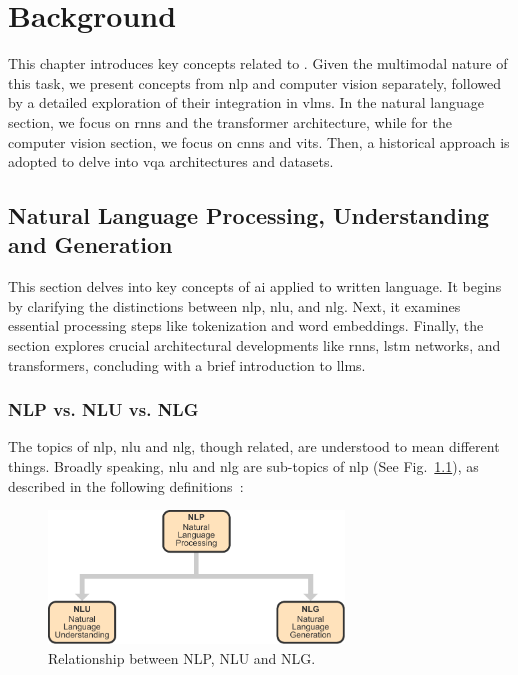 \chapter{Background}
\label{chapter:background}

This chapter introduces key concepts related to . Given the multimodal nature of this task, we present concepts from \gls{nlp} and computer vision separately, followed by a detailed exploration of their integration in \glspl{vlm}. In the natural language section, we focus on \glspl{rnn} and the transformer architecture, while for the computer vision section, we focus on \glspl{cnn} and \glspl{vit}. Then, a historical approach is adopted to delve into \gls{vqa} architectures and datasets.

\newpage


\section{Natural Language Processing, Understanding and Generation}

This section delves into key concepts of \gls{ai} applied to written language. It begins by clarifying the distinctions between \gls{nlp}, \gls{nlu}, and \gls{nlg}. Next, it examines essential processing steps like tokenization and word embeddings. Finally, the section explores crucial architectural developments like \glspl{rnn}, \gls{lstm} networks, and transformers, concluding with a brief introduction to \glspl{llm}.

\subsection{NLP vs. NLU vs. NLG}

The topics of \gls{nlp}, \gls{nlu} and \gls{nlg}, though related, are understood to mean different things. Broadly speaking, \gls{nlu} and \gls{nlg} are sub-topics of \gls{nlp} (See Fig.~\ref{fig:nlp_nlu_nlg}), as described in the following definitions~\cite{ibmNLGDifferences,datasolutNLGUnterschiede}:

\begin{figure}[!ht]
\begin{center}
\includegraphics[width=0.70\textwidth]{Figures/Background/nlp_nlu_nlg.pdf}
\caption{Relationship between NLP, NLU and NLG.}
\label{fig:nlp_nlu_nlg}
\end{center}
\end{figure}

